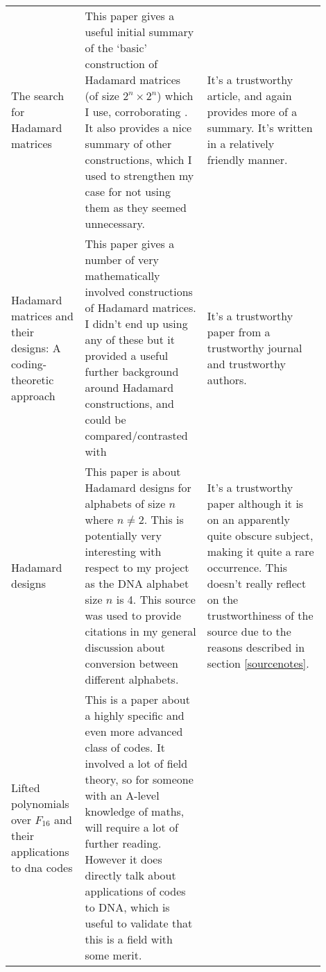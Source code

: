 \documentclass{article}
\begin{document}
\begin{center}
{\begin{longtable}{p{0.2\linewidth} p{0.35\linewidth} p{0.35\linewidth}}
    The search for Hadamard matrices \citep*{HadamardSearch1963GolombBaumert} &

    This paper gives a useful initial summary of the `basic' construction of
    Hadamard matrices (of size $2^n \times 2^n$)  which I use, corroborating
    \citep*{HadamardMatrices1978HedayatWallis}. It also provides a nice summary
    of other constructions, which I used to strengthen my case for not using
    them as they seemed unnecessary. &

    It's a trustworthy article, and again provides more of a summary. It's
    written in a relatively friendly manner. \\

    Hadamard matrices and their designs: A coding-theoretic approach \citep*{HadamardCodingTheoretic1992AssmusKey} & 

    This paper gives a number of very mathematically involved constructions of
    Hadamard matrices. I didn't end up using any of these but it provided a
    useful further background around Hadamard constructions, and could be
    compared/contrasted with \citep*{HadamardSearch1963GolombBaumert} & 

    It's a trustworthy paper from a trustworthy journal and trustworthy
    authors. \\

    Hadamard designs \citep*{HadamardDesigns1972Spence} & 

    This paper is about Hadamard designs for alphabets of size $n$ where $n
    \neq 2$. This is potentially very interesting with respect to my project as
    the DNA alphabet size $n$ is 4. This source was used to provide citations in my
    general discussion about conversion between different alphabets. &

    It's a trustworthy paper although it is on an apparently quite obscure
    subject, making it quite a rare occurrence. This doesn't really reflect on
    the trustworthiness of the source due to the reasons described in section
    \ref{sourcenotes}.  \\

    Lifted polynomials over ${F}_{16}$ and their applications to dna codes \citep*{PolynomialDNA2013OztasSiap} & 

    This is a paper about a highly specific and even more advanced class of
    codes. It involved a lot of field theory, so for someone with an A-level
    knowledge of maths, will require a lot of further reading. However it does
    directly talk about applications of codes to DNA, which is useful to
    validate that this is a field with some merit. &


\end{longtable}}
\end{center}
\end{document}
